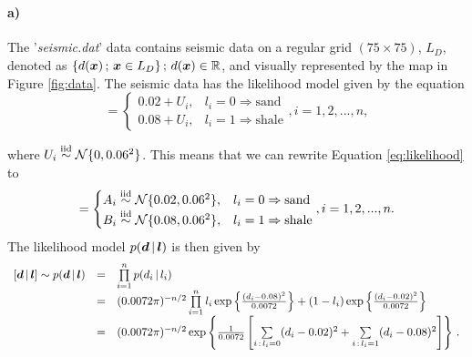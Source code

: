 \section{}
\label{sec:p1}
\paragraph{a)}
The '\textit{seismic.dat}' data contains seismic data on a regular grid $(75\times75)$, $L_D$, denoted as $\{d(\bm{x}) \,;\, \bm{x}\in L_D\} \,;\, d(\bm{x})\in \mathbb{R}$, and visually represented by the map in Figure \ref{fig:data}.
The seismic data has the likelihood model given by the equation
\begin{equation}
    [d_i\given\vect{l}] = \begin{cases}
                                0.02 + U_i, & l_i = 0 \Rightarrow \mathrm{sand} \\
                                0.08 + U_i, & l_i = 1 \Rightarrow \mathrm{shale}
                             \end{cases}
                            , i = 1, 2, ..., n,
    \label{eq:likelihood}
\end{equation}

where $U_i \overset{\mathrm{iid}}{\sim}\mathcal{N}\{0,0.06^2\}$. This means that we can rewrite Equation \ref{eq:likelihood} to 
\begin{equation}
    [d_i\given\vect{l}] = \begin{cases}
                                A_i\overset{\mathrm{iid}}{\sim}\N\{0.02,0.06^2\}, & l_i = 0 \Rightarrow \mathrm{sand} \\
                                B_i\overset{\mathrm{iid}}{\sim}\N\{0.08,0.06^2\}, & l_i = 1 \Rightarrow \mathrm{shale}
                             \end{cases}
                            , i = 1, 2, ..., n.
    \label{eq:likelihood2}
\end{equation}
The likelihood model $p(\bm{d}\, | \, \bm{l})$ is then given by 
\begin{equation}
    \begin{array}{rcl}
        [\bm{d}\, | \, \bm{l}] \sim p(\bm{d}\, | \, \bm{l}) & = & \prod\limits_{i=1}^n p(d_i\, | \, l_i) \\
        & = & (0.0072\pi)^{-n/2} \prod\limits_{i=1}^n l_i \exp\left\{\frac{(d_i - 0.08)^2}{0.0072} \right\} + (1-l_i) \exp\left\{\frac{(d_i - 0.02)^2}{0.0072} \right\} \\
         & = & (0.0072\pi)^{-n/2} \exp\left\{\frac{1}{0.0072} \left[\sum\limits_{i \,:\, l_i = 0} (d_i - 0.02)^2 + \sum\limits_{i \,:\, l_i = 1} (d_i - 0.08)^2\right]\right\} \, .
    \end{array}
    \label{eq:likelihood3}
\end{equation}

